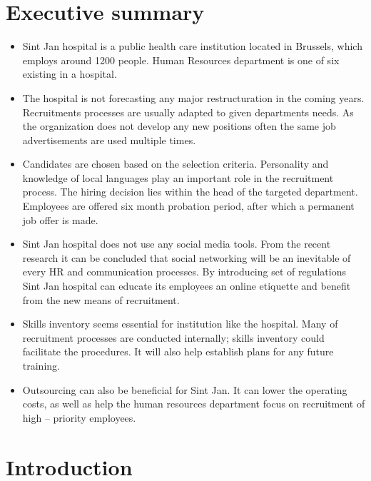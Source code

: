 \documentclass[a4paper,fleqn,11pt,dvips,titlepage]{article}
\numberwithin{figure}{section}
\numberwithin{equation}{section}
\begin{document}
\section*{Executive summary}

\begin{itemize}
  \item Sint Jan hospital is a public health care institution located in Brussels, which employs around 1200 people. Human Resources department is one of six existing in a hospital.
  \item The hospital is not forecasting any major restructuration in the coming years. Recruitments processes are usually adapted to given departments needs. As the organization does not develop any new positions often the same job advertisements are used multiple times.
  \item Candidates are chosen based on the selection criteria. Personality and knowledge of local languages play an important role in the recruitment process. The hiring decision lies within the head of the targeted department. Employees are offered six month probation period, after which a permanent job offer is made.
  \item Sint Jan hospital does not use any social media tools. From the recent research it can be concluded that social networking will be an inevitable of every HR and communication processes. By introducing set of regulations Sint Jan hospital can educate its employees an online etiquette and benefit from the new means of recruitment.
  \item Skills inventory seems essential for institution like the hospital. Many of recruitment processes are conducted internally; skills inventory could facilitate the procedures. It will also help establish plans for any future training. 
  \item Outsourcing can also be beneficial for Sint Jan. It can lower the operating costs, as well as help the human resources department focus on recruitment of high – priority employees. 
\end{itemize}

\newpage

\tableofcontents
\newpage
\setcounter{page}{1}

\section{Introduction}
\end{document}
